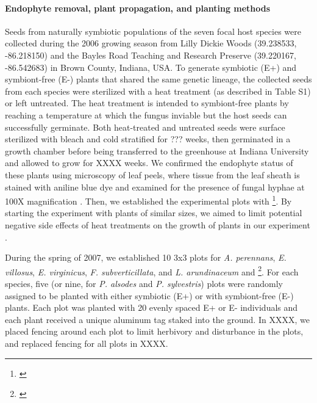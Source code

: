 \documentclass[12pt]{article}
\newcommand{\tom}[2]{{\color{red}{#1}}\footnote{\textit{\color{red}{#2}}}}
\begin{document}
\paragraph*{Endophyte removal, plant propagation, and planting methods}
Seeds from naturally symbiotic populations of the seven focal host species were collected during the 2006 growing season from Lilly Dickie Woods (39.238533, -86.218150) and the Bayles Road Teaching and Research Preserve (39.220167, -86.542683) in Brown County, Indiana, USA. 
To generate symbiotic (E+) and symbiont-free (E-) plants that shared the same genetic lineage, the collected seeds from each species were sterilized with a heat treatment (as described in Table S1) or left untreated. 
The heat treatment is intended to symbiont-free plants by reaching a temperature at which the fungus inviable but the host seeds can successfully germinate.
Both heat-treated and untreated seeds were surface sterilized with bleach and cold stratified for {\color{red}??? weeks}, then germinated in a growth chamber before being transferred to the greenhouse at Indiana University and allowed to grow for XXXX weeks. 
We confirmed the endophyte status of these plants using microscopy of leaf peels, where tissue from the leaf sheath is stained with aniline blue dye and examined for the presence of fungal hyphae at 100X magnification \cite{bacon2018stains}. 
Then, we established the experimental plots with \tom{vegetatively propogated clones of similar sizes from the plants}{not sure this happened}. 
By starting the experiment with plants of similar sizes, we aimed to limit potential negative side effects of heat treatments on the growth of plants in our experiment \cite{rudgers2009benefits}.

During the spring of 2007, we established 10 3x3 plots for \emph{A. perennans}, \emph{E. villosus}, \emph{E. virginicus}, \emph{F. subverticillata}, and \emph{L. arundinaceum}  and \tom{18 plots for \emph{P. alsodes} and \emph{P. sylvestris}}{I think one set was started in 2007 and another in 2008.}. 
For each species, five (or nine, for \emph{P. alsodes} and \emph{P. sylvestris}) plots were randomly assigned to be planted with either symbiotic (E+) or with symbiont-free (E-) plants.
Each plot was planted with 20 evenly spaced E+ or E- individuals and each plant received a unique aluminum tag staked into the ground. 
In XXXX, we placed fencing around each plot to limit herbivory and disturbance in the plots, and replaced fencing for all plots in XXXX.
\end{document}
